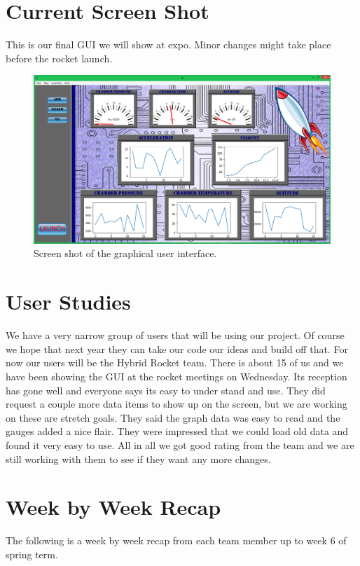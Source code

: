\documentclass[10pt,draftclsnofoot,onecolumn]{IEEEtran}
\begin{document}
\section{Current Screen Shot}
This is our final GUI we will show at expo. Minor changes might take place before the rocket launch. \par

\begin{figure}[!ht]
  \caption{Screen shot of the graphical user interface.}
  \centering
	\includegraphics[scale=.40]{HyroGui}
\end{figure}
\FloatBarrier

\section{User Studies}
We have a very narrow group of users that will be using our project. Of course we hope that next year they can take our code our ideas and build off that. For now our users will be the Hybrid Rocket team. There is about 15 of us and we have been showing the GUI at the rocket meetings on Wednesday. Its reception has gone well and everyone says its easy to under stand and use. They did request a couple more data items to show up on the screen, but we are working on these are stretch goals. They said the graph data was easy to read and the gauges added a nice flair. They were impressed that we could load old data and found it very easy to use. All in all we got good rating from the team and we are still working with them to see if they want any more changes.\par

\section{Week by Week Recap}
The following is a week by week recap from each team member up to week 6 of spring term.  \par
\end{document}
